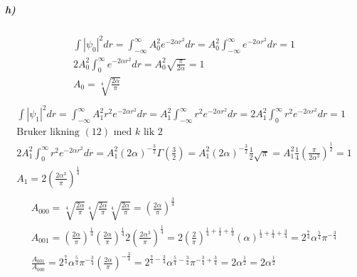 \documentclass[11pt, A4paper,norsk]{article}
\begin{document}
			\subparagraph{h)}
				\begin{gather*}
\int |\psi_{0}|^2 dr = \int_{- \infty}^{\infty} A_{0}^2 e^{- 2 \alpha r^2} dr = A_{0}^2 \int_{- \infty}^{\infty} e^{- 2 \alpha r^2} dr = 1 \\
2 A_{0}^2 \int_{0}^{\infty} e^{- 2 \alpha r^2} dr = A_{0}^2 \sqrt{\frac{\pi}{2 \alpha}} = 1 \\
A_0 = \sqrt[4]{\frac{2 \alpha}{\pi}} \\
				\end{gather*}
				\begin{gather*}
\int |\psi_{1}|^2 dr = \int_{- \infty}^{\infty} A_{1}^2 r^2 e^{- 2 \alpha r^2} dr = A_{1}^2 \int_{- \infty}^{\infty} r^2 e^{- 2 \alpha r^2} dr = 2 A_{1}^2 \int_{0}^{\infty} r^2 e^{- 2 \alpha r^2} dr = 1 \\
\text{Bruker likning $(12)$ med $k$ lik $2$} \\
2 A_{1}^2 \int_{0}^{\infty} r^2 e^{- 2 \alpha r^2} dr = A_{1}^2 (2 \alpha)^{- \frac{3}{2}} \Gamma\left( \frac{3}{2} \right) = A_{1}^2 (2 \alpha)^{- \frac{3}{2}} \frac{1}{2} \sqrt{\pi} = A_{1}^2 \frac{1}{4} \left( \frac{\pi}{2 \alpha^3} \right)^{\frac{1}{2}} = 1 \\
A_{1} = 2 \left( \frac{2 \alpha^3}{\pi} \right)^{\frac{1}{4}} \\
				\end{gather*}
				\begin{gather*}
A_{000} = \sqrt[4]{\frac{2 \alpha}{\pi}} \sqrt[4]{\frac{2 \alpha}{\pi}} \sqrt[4]{\frac{2 \alpha}{\pi}} = \left( \frac{2 \alpha}{\pi} \right)^{\frac{3}{4}} \\
A_{001} = \left( \frac{2 \alpha}{\pi} \right)^{\frac{1}{4}} \left( \frac{2 \alpha}{\pi} \right)^{\frac{1}{4}} 2 \left( \frac{2 \alpha^3}{\pi} \right)^{\frac{1}{4}} = 2 \left( \frac{2}{\pi} \right)^{\frac{1}{4} + \frac{1}{4} + \frac{1}{4}} (\alpha)^{\frac{1}{4} + \frac{1}{4} + \frac{3}{4}} = 2^{\frac{7}{4}} \alpha^{\frac{5}{4}} \pi^{- \frac{3}{4}} \\
\frac{A_{001}}{A_{000}} = 2^{\frac{7}{4}} \alpha^{\frac{5}{4}} \pi^{- \frac{3}{4}} \left( \frac{2 \alpha}{\pi} \right)^{- \frac{3}{4}} = 2^{\frac{7}{4} - \frac{3}{4}} \alpha^{\frac{5}{4} - \frac{3}{4}} \pi^{- \frac{3}{4} + \frac{3}{4}} = 2 \alpha^{\frac{1}{2}} = 2 \alpha^{\frac{1}{2}}
				\end{gather*}
\end{document}
